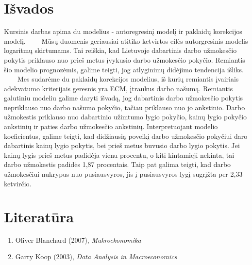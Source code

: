 \documentclass[12pt,a4paper]{article}
\theoremstyle{change}\newtheorem{salyga}{Uždavinys}
\begin{document}
\section{Išvados}
\hspace{40pt}   
Kursinis darbas apima du modelius - autoregresinį modelį ir paklaidų korekcijos modelį. 
\vskip 8pt
$\qquad$Mūsų duomenis geriausiai atitiko ketvirtos eilės autorgresinis modelis logaritmų skirtumams. Tai reiškia, kad Lietuvoje dabartinis darbo užmokesčio pokytis priklauso nuo prieš metus įvykusio darbo užmokesčio pokyčio. Remiantis šio modelio prognozėmis, galime teigti, jog atlyginimų didėjimo tendencija išliks. 
\vskip 8pt
$\qquad$Mes sudarėme du paklaidų korekcijos modelius, iš kurių remiantis įvairiais adekvatumo kriterijais geresnis yra ECM, įtraukus darbo našumą. Remiantis galutiniu modeliu galime daryti išvadą, jog dabartinis darbo užmokesčio pokytis nepriklauso nuo darbo našumo pokyčio, tačiau priklauso nuo jo ankstinio. Darbo užmokestis priklauso nuo dabartinio užimtumo lygio pokyčio, kainų lygio pokyčio ankstinių ir paties darbo užmokesčio ankstinių. Interpretuojant modelio koeficientus, galime teigti, kad didžiausią poveikį darbo užmokesčio pokyčiui daro dabartinis kainų lygio pokytis, bei prieš metus buvusio darbo lygio pokytis. Jei kainų lygis prieš metus padidėja vienu procentu, o kiti kintamieji nekinta, tai darbo užmokestis padidės 1,87 procentais. Taip pat galima teigti, kad darbo užmokesčiui nukrypus nuo pusiausvyros, jis į pusiausvyros lygį sugrįžta per 2,33 ketvirčio. 




\pagebreak     
\section{Literatūra}  

\begin{enumerate}
\item Oliver Blanchard (2007), \textit{Makroekonomika }   
\item Garry Koop (2003), \textit{Data Analysis in Macroeconomics }
\end{enumerate}





\pagebreak     
\end{document}
